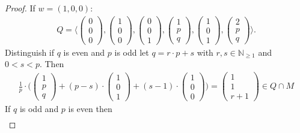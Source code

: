 \documentclass[12pt, english]{article}
\begin{document}
\begin{proof}
	If $w=(1,0,0)$:
	\begin{align*}
		Q = \langle \begin{pmatrix} 0\\0\\0 \end{pmatrix}, \begin{pmatrix} 1\\0\\0 \end{pmatrix}, \begin{pmatrix} 0\\0\\1 \end{pmatrix}, \begin{pmatrix} 1\\p\\q \end{pmatrix}, \begin{pmatrix} 1\\0\\1 \end{pmatrix}, \begin{pmatrix} 2\\p\\q \end{pmatrix} \rangle.
	\end{align*}
	Distinguish if $q$ is even and $p$ is odd let $q = r \cdot p + s$ with $r,s \in \mathbb{N}_{\geq 1}$ and $0<s<p$. Then
	\begin{align*}
		\frac{1}{p} \cdot \Big( \begin{pmatrix}
			1\\p\\q
		\end{pmatrix} + (p-s) \cdot \begin{pmatrix}
			1\\0\\1
		\end{pmatrix} + (s-1) \cdot \begin{pmatrix}
			1\\0\\0
		\end{pmatrix}  \Big) = \begin{pmatrix} 1\\1\\r+1	\end{pmatrix} \in Q \cap M
	\end{align*} 
	If $q$ is odd and $p$ is even then
	\begin{align*}

\end{align*}
\end{proof}
\end{document}
